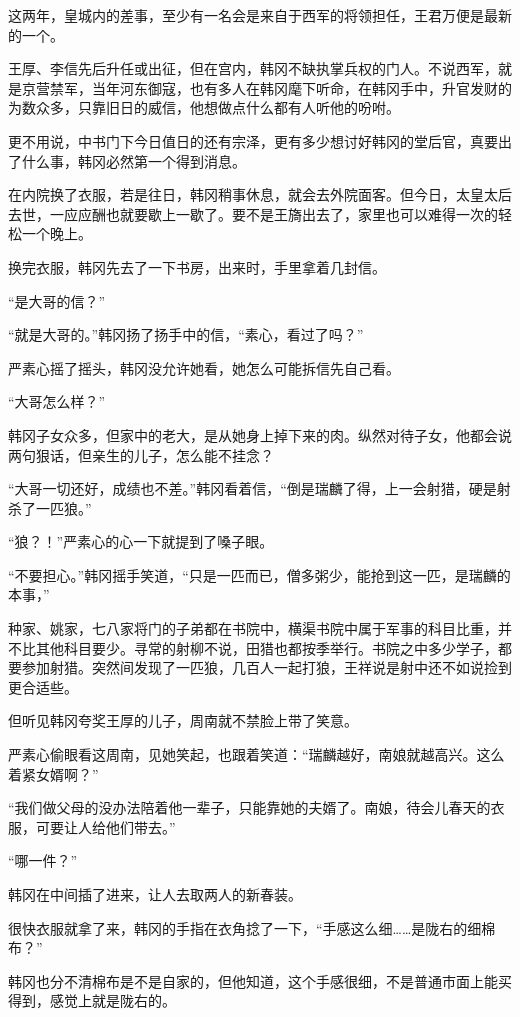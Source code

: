 这两年，皇城内的差事，至少有一名会是来自于西军的将领担任，王君万便是最新的一个。

王厚、李信先后升任或出征，但在宫内，韩冈不缺执掌兵权的门人。不说西军，就是京营禁军，当年河东御寇，也有多人在韩冈麾下听命，在韩冈手中，升官发财的为数众多，只靠旧日的威信，他想做点什么都有人听他的吩咐。

更不用说，中书门下今日值日的还有宗泽，更有多少想讨好韩冈的堂后官，真要出了什么事，韩冈必然第一个得到消息。

在内院换了衣服，若是往日，韩冈稍事休息，就会去外院面客。但今日，太皇太后去世，一应应酬也就要歇上一歇了。要不是王旖出去了，家里也可以难得一次的轻松一个晚上。

换完衣服，韩冈先去了一下书房，出来时，手里拿着几封信。

“是大哥的信？”

“就是大哥的。”韩冈扬了扬手中的信，“素心，看过了吗？”

严素心摇了摇头，韩冈没允许她看，她怎么可能拆信先自己看。

“大哥怎么样？”

韩冈子女众多，但家中的老大，是从她身上掉下来的肉。纵然对待子女，他都会说两句狠话，但亲生的儿子，怎么能不挂念？

“大哥一切还好，成绩也不差。”韩冈看着信，“倒是瑞麟了得，上一会射猎，硬是射杀了一匹狼。”

“狼？！”严素心的心一下就提到了嗓子眼。

“不要担心。”韩冈摇手笑道，“只是一匹而已，僧多粥少，能抢到这一匹，是瑞麟的本事，”

种家、姚家，七八家将门的子弟都在书院中，横渠书院中属于军事的科目比重，并不比其他科目要少。寻常的射柳不说，田猎也都按季举行。书院之中多少学子，都要参加射猎。突然间发现了一匹狼，几百人一起打狼，王祥说是射中还不如说捡到更合适些。

但听见韩冈夸奖王厚的儿子，周南就不禁脸上带了笑意。

严素心偷眼看这周南，见她笑起，也跟着笑道：“瑞麟越好，南娘就越高兴。这么着紧女婿啊？”

“我们做父母的没办法陪着他一辈子，只能靠她的夫婿了。南娘，待会儿春天的衣服，可要让人给他们带去。”

“哪一件？”

韩冈在中间插了进来，让人去取两人的新春装。

很快衣服就拿了来，韩冈的手指在衣角捻了一下，“手感这么细……是陇右的细棉布？”

韩冈也分不清棉布是不是自家的，但他知道，这个手感很细，不是普通市面上能买得到，感觉上就是陇右的。

